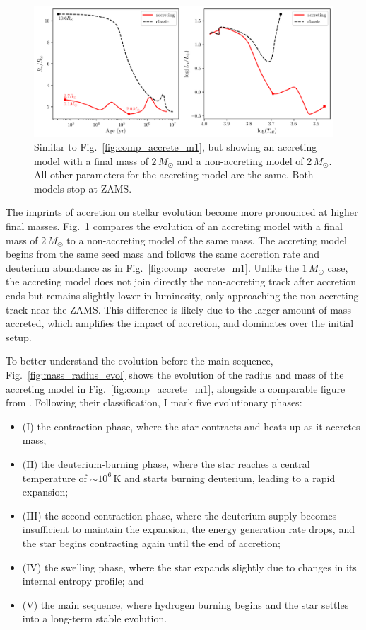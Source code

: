 \documentclass[12pt,a4paper]{article}
\newcommand{\mr}{\mathrm}
\begin{document}
\begin{figure}
  \centering
  \includegraphics[width=.95\textwidth,keepaspectratio]{m2_cmp_acc.pdf}
  \caption{Similar to Fig.~\ref{fig:comp_accrete_m1}, but showing an accreting model with a final mass of $2\,M_\odot$ and a non-accreting model of $2\,M_\odot$. All other parameters for the accreting model are the same. Both models stop at ZAMS.}
  \label{fig:comp_accrete_m2}
\end{figure}

The imprints of accretion on stellar evolution become more pronounced at higher final masses. Fig.~\ref{fig:comp_accrete_m2} compares the evolution of an accreting model with a final mass of $2\,M_\odot$ to a non-accreting model of the same mass. The accreting model begins from the same seed mass and follows the same accretion rate and deuterium abundance as in Fig.~\ref{fig:comp_accrete_m1}. Unlike the $1\,M_\odot$ case, the accreting model does not join directly the non-accreting track after accretion ends but remains slightly lower in luminosity, only approaching the non-accreting track near the ZAMS. This difference is likely due to the larger amount of mass accreted, which amplifies the impact of accretion, and dominates over the initial setup.

To better understand the evolution before the main sequence, Fig.~\ref{fig:mass_radius_evol} shows the evolution of the radius and mass of the accreting model in Fig.~\ref{fig:comp_accrete_m1}, alongside a comparable figure from \textcite{KunitomoEtAl2017}. Following their classification, I mark five evolutionary phases:
\begin{itemize}
  \item (I) the contraction phase, where the star contracts and heats up as it accretes mass;
  \item (II) the deuterium-burning phase, where the star reaches a central temperature of $\sim 10^6\,\mr{K}$ and starts burning deuterium, leading to a rapid expansion;
  \item (III) the second contraction phase, where the deuterium supply becomes insufficient to maintain the expansion, the energy generation rate drops, and the star begins contracting again until the end of accretion;
  \item (IV) the swelling phase, where the star expands slightly due to changes in its internal entropy profile; and
  \item (V) the main sequence, where hydrogen burning begins and the star settles into a long-term stable evolution.
\end{itemize}
\end{document}
